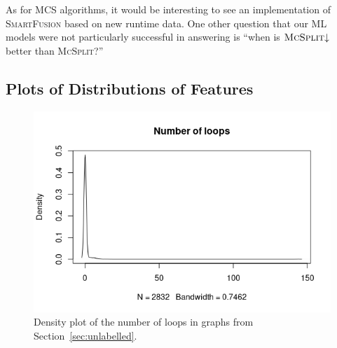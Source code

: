\documentclass{l4proj}
\theoremstyle{definition}
\theoremstyle{remark}
\begin{document}
As for MCS algorithms, it would be interesting to see an implementation of
\textsc{SmartFusion} based on new runtime data. One other question that our ML
models were not particularly successful in answering is ``when is
$\textsc{McSplit}{\downarrow}$ better than \textsc{McSplit}?''

\begin{appendices}
  \chapter{Plots of Distributions of Features} \label{appendix:plots}
  \begin{figure}
    \centering
    \includegraphics[scale=0.7]{images/sip_loops.png}
    \caption{Density plot of the number of loops in graphs from
      Section~\ref{sec:unlabelled}.}
    \label{fig:loops}
  \end{figure}


\end{appendices}
\end{document}
